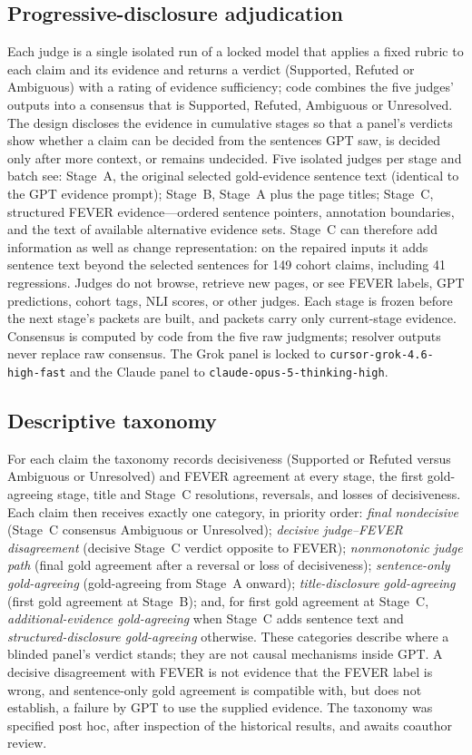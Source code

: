 \subsection{Progressive-disclosure adjudication}
\label{sec:protocol}
Each judge is a single isolated run of a locked model that applies a fixed rubric to each claim and its evidence and returns a verdict (Supported, Refuted or Ambiguous) with a rating of evidence sufficiency; code combines the five judges' outputs into a consensus that is Supported, Refuted, Ambiguous or Unresolved.
The design discloses the evidence in cumulative stages so that a panel's verdicts show whether a claim can be decided from the sentences GPT saw, is decided only after more context, or remains undecided.
Five isolated judges per stage and batch see:
Stage~A, the original selected gold-evidence sentence text (identical to the GPT evidence prompt);
Stage~B, Stage~A plus the page titles;
Stage~C, structured FEVER evidence---ordered sentence pointers, annotation boundaries, and the text of available alternative evidence sets.
Stage~C can therefore add information as well as change representation: on the repaired inputs it adds sentence text beyond the selected sentences for 149 cohort claims, including 41 regressions.
Judges do not browse, retrieve new pages, or see FEVER labels, GPT predictions, cohort tags, NLI scores, or other judges.
Each stage is frozen before the next stage's packets are built, and packets carry only current-stage evidence.
Consensus is computed by code from the five raw judgments; resolver outputs never replace raw consensus.
The Grok panel is locked to \texttt{cursor-grok-4.6-high-fast} and the Claude panel to \texttt{claude-opus-5-thinking-high}.

\subsection{Descriptive taxonomy}
\label{sec:taxonomy}
For each claim the taxonomy records decisiveness (Supported or Refuted versus Ambiguous or Unresolved) and FEVER agreement at every stage, the first gold-agreeing stage, title and Stage~C resolutions, reversals, and losses of decisiveness.
Each claim then receives exactly one category, in priority order:
\emph{final nondecisive} (Stage~C consensus Ambiguous or Unresolved);
\emph{decisive judge--FEVER disagreement} (decisive Stage~C verdict opposite to FEVER);
\emph{nonmonotonic judge path} (final gold agreement after a reversal or loss of decisiveness);
\emph{sentence-only gold-agreeing} (gold-agreeing from Stage~A onward);
\emph{title-disclosure gold-agreeing} (first gold agreement at Stage~B);
and, for first gold agreement at Stage~C, \emph{additional-evidence gold-agreeing} when Stage~C adds sentence text and \emph{structured-disclosure gold-agreeing} otherwise.
These categories describe where a blinded panel's verdict stands; they are not causal mechanisms inside GPT.
A decisive disagreement with FEVER is not evidence that the FEVER label is wrong, and sentence-only gold agreement is compatible with, but does not establish, a failure by GPT to use the supplied evidence.
The taxonomy was specified post hoc, after inspection of the historical results, and awaits coauthor review.

